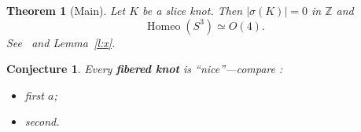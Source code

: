 \documentclass{amsart}
\newtheorem{thm}{Theorem}[section]
\newtheorem*{conj*}{Conjecture}
\newcommand{\Z}{\mathbb{Z}}
\newcommand{\abs}[1]{\left|#1\right|}
\DeclareMathOperator{\Homeo}{Homeo}
\begin{document}

\begin{thm}[Main]\label{t:main}
Let $K$ be a \emph{slice knot}. Then $\abs{\sigma(K)} = 0$ in $\Z$ %
and \[ \Homeo(S^3) \simeq O(4). \] See~\cite[Thm.~2]{Fr82} and Lemma~\ref{l:x}.
\end{thm}
\begin{conj*}
Every \textbf{fibered knot} is ``nice''---compare \cite{G}:
\begin{itemize}\item first $a$; \item second.\end{itemize}
\end{conj*}
\end{document}
